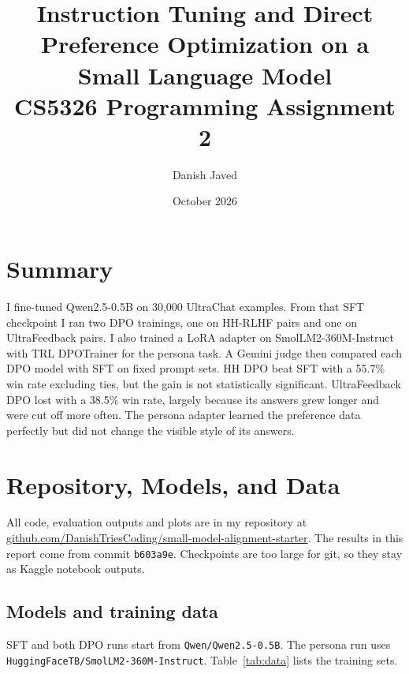 \documentclass[11pt]{article}
\title{Instruction Tuning and Direct Preference Optimization on a Small Language Model\\[2pt]
\large CS5326 Programming Assignment 2}
\author{Danish Javed \quad 28100421}
\date{October 2026}
\newcommand{\brk}{\allowbreak}
\begin{document}
\maketitle

\section*{Summary}
I fine-tuned Qwen2.5-0.5B on 30,000 UltraChat examples.
From that SFT checkpoint I ran two DPO trainings, one on HH-RLHF pairs and one on UltraFeedback pairs.
I also trained a LoRA adapter on SmolLM2-360M-Instruct with TRL DPOTrainer for the persona task.
A Gemini judge then compared each DPO model with SFT on fixed prompt sets.
HH DPO beat SFT with a 55.7\% win rate excluding ties, but the gain is not statistically significant.
UltraFeedback DPO lost with a 38.5\% win rate, largely because its answers grew longer and were cut off more often.
The persona adapter learned the preference data perfectly but did not change the visible style of its answers.

\section{Repository, Models, and Data}

All code, evaluation outputs and plots are in my repository at
\href{https://github.com/DanishTriesCoding/small-model-alignment-starter}{github.com/\brk DanishTriesCoding/\brk small-model-alignment-starter}.
The results in this report come from commit \texttt{b603a9e}.
Checkpoints are too large for git, so they stay as Kaggle notebook outputs.

\subsection{Models and training data}

SFT and both DPO runs start from \texttt{Qwen/\brk Qwen2.5-0.5B}.
The persona run uses \texttt{HuggingFaceTB/\brk SmolLM2-360M-Instruct}.
Table~\ref{tab:data} lists the training sets.
\end{document}
